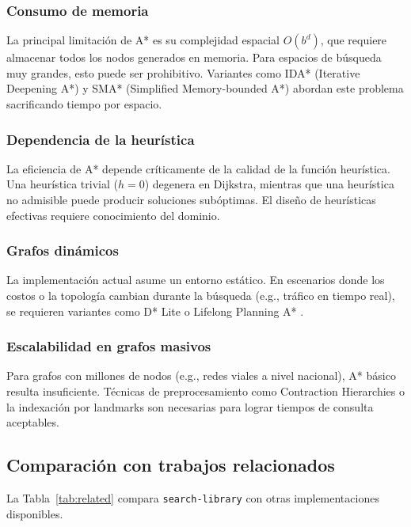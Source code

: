 \subsubsection{Consumo de memoria}

La principal limitación de A* es su complejidad espacial $O(b^d)$, que requiere almacenar todos los nodos generados en memoria. Para espacios de búsqueda muy grandes, esto puede ser prohibitivo. Variantes como IDA* (Iterative Deepening A*) \cite{korf1985depth} y SMA* (Simplified Memory-bounded A*) \cite{russell1992efficient} abordan este problema sacrificando tiempo por espacio.

\subsubsection{Dependencia de la heurística}

La eficiencia de A* depende críticamente de la calidad de la función heurística. Una heurística trivial ($h = 0$) degenera en Dijkstra, mientras que una heurística no admisible puede producir soluciones subóptimas. El diseño de heurísticas efectivas requiere conocimiento del dominio.

\subsubsection{Grafos dinámicos}

La implementación actual asume un entorno estático. En escenarios donde los costos o la topología cambian durante la búsqueda (e.g., tráfico en tiempo real), se requieren variantes como D* Lite \cite{koenig2002d} o Lifelong Planning A* \cite{koenig2004lifelong}.

\subsubsection{Escalabilidad en grafos masivos}

Para grafos con millones de nodos (e.g., redes viales a nivel nacional), A* básico resulta insuficiente. Técnicas de preprocesamiento como Contraction Hierarchies \cite{geisberger2008contraction} o la indexación por landmarks son necesarias para lograr tiempos de consulta aceptables.

\subsection{Comparación con trabajos relacionados}

La Tabla~\ref{tab:related} compara \texttt{search-library} con otras implementaciones disponibles.


